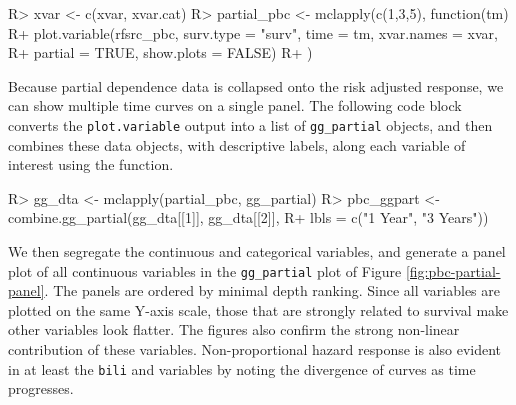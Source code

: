 \documentclass[article]{jss}
\begin{document}
\begin{Schunk}
\begin{Sinput}
R> xvar <- c(xvar, xvar.cat)
R> partial_pbc <- mclapply(c(1,3,5), function(tm){
R+   plot.variable(rfsrc_pbc, surv.type = "surv", time = tm, xvar.names = xvar,
R+                 partial = TRUE, show.plots = FALSE)
R+   })
\end{Sinput}
\end{Schunk}

Because partial dependence data is collapsed onto the risk adjusted
response, we can show multiple time curves on a single panel. The
following code block converts the \texttt{plot.variable} output into a
list of \texttt{gg\_partial} objects, and then combines these data
objects, with descriptive labels, along each variable of interest using
the  function.

\begin{Schunk}
\begin{Sinput}
R> gg_dta <- mclapply(partial_pbc, gg_partial)
R> pbc_ggpart <- combine.gg_partial(gg_dta[[1]], gg_dta[[2]],
R+                                  lbls = c("1 Year", "3 Years"))
\end{Sinput}
\end{Schunk}

We then segregate the continuous and categorical variables, and generate
a panel plot of all continuous variables in the \texttt{gg\_partial}
plot of Figure \ref{fig:pbc-partial-panel}. The panels are ordered by
minimal depth ranking. Since all variables are plotted on the same
Y-axis scale, those that are strongly related to survival make other
variables look flatter. The figures also confirm the strong non-linear
contribution of these variables. Non-proportional hazard response is
also evident in at least the \texttt{bili} and  variables
by noting the divergence of curves as time progresses.
\end{document}
